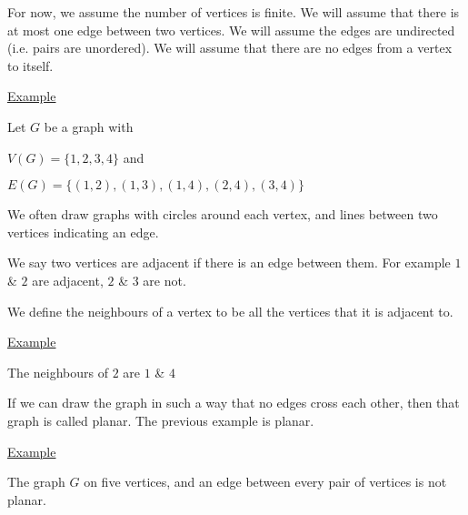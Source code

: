 \documentclass{article}
\begin{document}
For now, we assume the number of vertices is finite. We will assume that there is at most one edge between two vertices. We will assume the edges are undirected (i.e. pairs are unordered). We will assume that there are no edges from a vertex to itself.

\underline{Example}

Let $G$ be a graph with 

$V(G) = \{1,2,3,4\}$ and

$E(G) = \{(1,2),(1,3),(1,4),(2,4),(3,4)\}$

We often draw graphs with circles around each vertex, and lines between two vertices indicating an edge. 

\begin{center}
\end{center}

We say two vertices are adjacent if there is an edge between them. For example $1$ \& $2$ are adjacent, $2$ \& $3$ are not.

We define the neighbours of a vertex to be all the vertices that it is adjacent to.

\underline{Example} 

The neighbours of $2$ are $1$ \& $4$

If we can draw the graph in such a way that no edges cross each other, then that graph is called planar. The previous example is planar. 

\underline{Example}

The graph $G$ on five vertices, and an edge between every pair of vertices is not planar. 

\begin{center}
\end{center}
\end{document}
